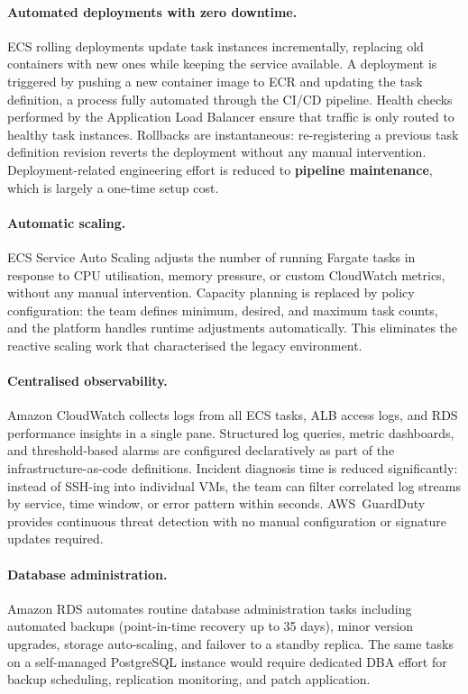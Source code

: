 \paragraph{Automated deployments with zero downtime.}
ECS rolling deployments update task instances incrementally, replacing
old containers with new ones while keeping the service available.
A deployment is triggered by pushing a new container image to ECR and
updating the task definition, a process fully automated through the
CI/CD pipeline.
Health checks performed by the Application Load Balancer ensure that
traffic is only routed to healthy task instances.
Rollbacks are instantaneous: re-registering a previous task definition
revision reverts the deployment without any manual intervention.
Deployment-related engineering effort is reduced to \textbf{pipeline
maintenance}, which is largely a one-time setup cost.

\paragraph{Automatic scaling.}
ECS Service Auto Scaling adjusts the number of running Fargate tasks
in response to CPU utilisation, memory pressure, or custom CloudWatch
metrics, without any manual intervention.
Capacity planning is replaced by policy configuration: the team defines
minimum, desired, and maximum task counts, and the platform handles
runtime adjustments automatically.
This eliminates the reactive scaling work that characterised the legacy
environment.

\paragraph{Centralised observability.}
Amazon CloudWatch collects logs from all ECS tasks, ALB access logs,
and RDS performance insights in a single pane.
Structured log queries, metric dashboards, and threshold-based alarms
are configured declaratively as part of the infrastructure-as-code
definitions.
Incident diagnosis time is reduced significantly: instead of SSH-ing
into individual VMs, the team can filter correlated log streams by
service, time window, or error pattern within seconds.
AWS~GuardDuty provides continuous threat detection with no manual
configuration or signature updates required.

\paragraph{Database administration.}
Amazon RDS automates routine database administration tasks including
automated backups (point-in-time recovery up to 35 days), minor
version upgrades, storage auto-scaling, and failover to a standby
replica.
The same tasks on a self-managed PostgreSQL instance would require
dedicated DBA effort for backup scheduling, replication monitoring, and
patch application.

